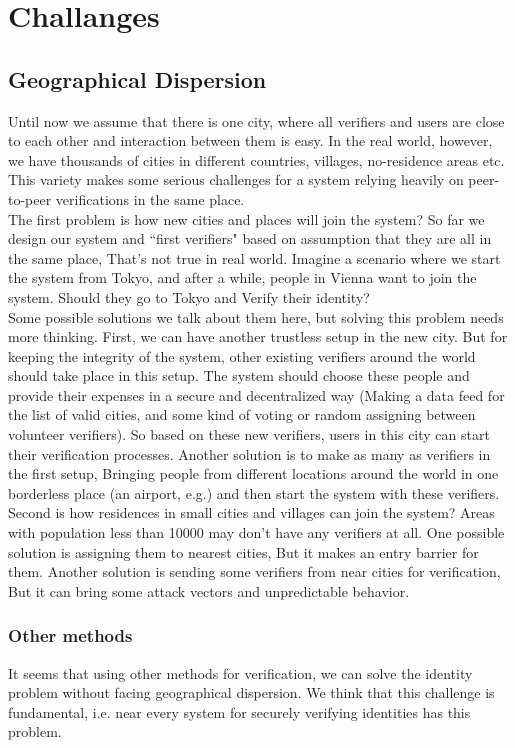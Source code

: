 \documentclass[conference]{IEEEtran}
\begin{document}
\section{Challanges }


\subsection{Geographical Dispersion}
Until now we assume that there is one city, where all verifiers and users are close to each other and interaction between them is easy. In the real world, however, we have thousands of cities in different countries, villages, no-residence areas etc. This variety makes some serious challenges for a system relying heavily on peer-to-peer verifications in the same place.
\\
The first problem is how new cities and places will join the system? So far we design our system and ``first verifiers" based on assumption that they are all in the same place, That's not true in real world. Imagine a scenario where we start the system from Tokyo, and after a while, people in Vienna want to join the system. Should they go to Tokyo and Verify their identity?
\\
Some possible solutions we talk about them here, but solving this problem needs more thinking. First, we can have another trustless setup in the new city. But for keeping the integrity of the system, other existing verifiers around the world should take place in this setup. The system should choose these people and provide their expenses in a secure and decentralized way (Making a data feed for the list of valid cities, and some kind of voting or random assigning between volunteer verifiers). So based on these new verifiers, users in this city can start their verification processes. Another solution is to make as many as verifiers in the first setup, Bringing people from different locations around the world in one borderless place (an airport, e.g.) and then start the system with these verifiers. 
\\

Second is how residences in small cities and villages can join the system? Areas with population less than 10000  may don't have any verifiers at all. One possible solution is assigning them to nearest cities, But it makes an entry barrier for them. Another solution is sending some verifiers from near cities for verification, But it can bring some attack vectors and unpredictable behavior. 

\subsubsection*{Other methods}
It seems that using other methods for verification, we can solve the identity problem without facing geographical dispersion. We think that this challenge is fundamental, i.e. near every system for securely verifying identities has this problem.
\\
\end{document}
